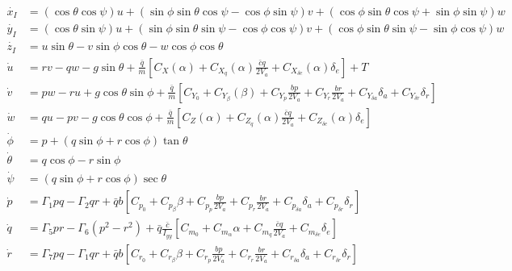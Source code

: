 \documentclass{article}
\begin{document}
\begin{align*}
  \dot{x_I} &= (\cos \theta \cos \psi) u + (\sin \phi \sin \theta \cos \psi -
  \cos \phi \sin \psi) v + (\cos \phi \sin \theta \cos \psi + \sin \phi \sin
  \psi)
  w \\
  \dot{y_I} &= (\cos \theta \sin \psi) u + (\sin \phi \sin \theta \sin \psi -
  \cos \phi \cos \psi) v + (\cos \phi \sin \theta \sin \psi - \sin \phi \cos
  \psi)
  w \\
  \dot{z_I} &= u \sin \theta - v \sin \phi \cos \theta - w \cos \phi \cos
  \theta \\
  \dot{u} &= rv - qw - g \sin \theta + \frac{\bar{q}}{m} \left [ C_X(\alpha) +
    C_{X_q}(\alpha) \frac{\bar{c} q}{2V_a} + C_{X_{\delta e}}(\alpha) \delta_e
  \right ] + T \\
  \dot{v} &= pw - ru + g \cos \theta \sin \phi + \frac{\bar{q}}{m} \left [
    C_{Y_0} + C_{Y_\beta} (\beta) + C_{Y_p}\frac{b p}{2V_a} + C_{Y_r}\frac{b
      r}{2V_a} + C_{Y_{\delta a}} \delta_a + C_{Y_{\delta r}} \delta_r
  \right ] \\
  \dot{w} &= qu - pv - g \cos \theta \cos \phi + \frac{\bar{q}}{m} \left [
    C_Z(\alpha) + C_{Z_q}(\alpha) \frac{\bar{c} q}{2V_a} + C_{Z_{\delta
        e}}(\alpha) \delta_e
  \right ] \\
  \dot{\phi} &= p + (q \sin \phi  + r \cos \phi) \tan \theta \\
  \dot{\theta} &= q \cos \phi -r \sin \phi  \\
  \dot{\psi} &= (q \sin \phi + r \cos \phi ) \sec \theta \\
  \dot{p} &= \Gamma_1 pq - \Gamma_2 qr + \bar{q}b \left [ C_{p_0} +
    C_{p_\beta} \beta + C_{p_p} \frac{bp}{2V_a} + C_{p_r} \frac{br}{2V_a} +
    C_{p_{\delta a}} \delta_a + C_{p_{\delta r}} \delta_r \right ] \\
  \dot{q} &=
  \Gamma_5 pr - \Gamma_6 (p^2-r^2) + \bar{q}\frac{\bar{c}}{I_{yy}} \left [
    C_{m_0} + C_{m_\alpha} \alpha + C_{m_q} \frac{\bar{c}q}{2V_a} + 
    C_{m_{\delta e}} \delta_e \right ]\\
  \dot{r} &= \Gamma_7 pq - \Gamma_1 qr + \bar{q}b \left [ C_{r_0} +
    C_{r_\beta} \beta + C_{r_p} \frac{bp}{2V_a} + C_{r_r} \frac{br}{2V_a} +
    C_{r_{\delta a}} \delta_a + C_{r_{\delta r}} \delta_r \right ] \\
\end{align*}
 
\end{document}
